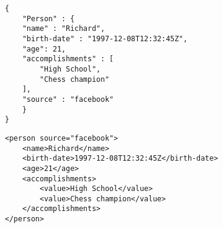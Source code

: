 \begin{apendicesenv}
\begin{lstlisting}[caption=Exemplo de documento JSON,label={lst:jsondoc1}]
{ 
    "Person" : {
    "name" : "Richard",
    "birth-date" : "1997-12-08T12:32:45Z",
    "age": 21,
    "accomplishments" : [
        "High School",
        "Chess champion"
    ],
    "source" : "facebook"
    }
}
\end{lstlisting}

\begin{lstlisting}[caption=Exemplo de documento XML,label={lst:xmldoc1}]
<person source="facebook">
    <name>Richard</name>
    <birth-date>1997-12-08T12:32:45Z</birth-date>
    <age>21</age>
    <accomplishments>
        <value>High School</value>
        <value>Chess champion</value>
    </accomplishments>
</person>
\end{lstlisting}

\end{apendicesenv}
